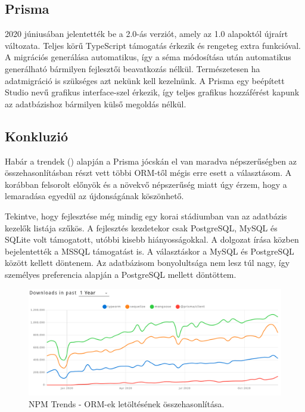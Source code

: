 \subsection{Prisma}
2020 júniusában jelentették be a 2.0-ás verziót, amely az 1.0 alapoktól újraírt változata.
Teljes körű TypeScript támogatás érkezik és rengeteg extra funkcióval.
A migrációs generálása automatikus, így a séma módosítása után automatikus generálható bármilyen fejlesztői beavatkozás nélkül.
Természetesen ha adatmigráció is szükséges azt nekünk kell kezelnünk.
A Prisma egy beépített Studio nevű grafikus interface-szel érkezik, így teljes grafikus hozzáférést kapunk az adatbázishoz bármilyen külső megoldás nélkül.


\subsection{Konkluzió}
Habár a trendek () alapján a Prisma jócskán el van maradva népszerűségben az összehasonlításban részt vett többi ORM-től mégis erre esett a választásom.
A korábban felsorolt előnyök és a növekvő népszerűség miatt úgy érzem, hogy a lemaradása egyedül az újdonságának köszönhető.

Tekintve, hogy fejlesztése még mindig egy korai stádiumban van az adatbázis kezelők listája szűkös.
A fejlesztés kezdetekor csak PostgreSQL, MySQL és SQLite volt támogatott, utóbbi kisebb hiányosságokkal.
A dolgozat írása közben bejelentették a MSSQL támogatást is. 
A választáskor a MySQL és PostgreSQL között kellett döntenem.
Az adatbázisom bonyolultsága nem lesz túl nagy, így személyes preferencia alapján a PostgreSQL mellett döntöttem.

\begin{figure}[!ht]
  \centering
  \includegraphics[width=150mm, keepaspectratio]{figures/orm_npm_trends.png}
  \caption{NPM Trends - ORM-ek letöltésének összehasonlítása.}
  \label{fig:ORMTrends}
\end{figure}

